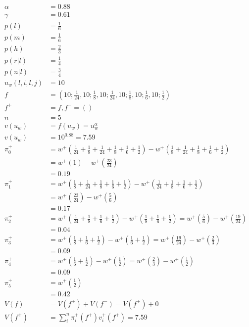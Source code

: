 \documentclass[graybox]{svmult}
\begin{document}
\begin{align*}
\alpha &= 0.88\\
\gamma &= 0.61\\
p(l) &= \frac{1}{6}\\
p(m) &= \frac{1}{6}\\
p(h) &= \frac{2}{3}\\
p(r | l) &= \frac{1}{4}\\
p(n | l) &= \frac{3}{4}\\
u_{w}(l, i, l, j) &= 10\\
f&=(10;\frac{1}{24},10;\frac{1}{8},10;\frac{1}{24},10;\frac{1}{8},10;\frac{1}{6},10;\frac{1}{2})\\
f^{+}&=f,f^{-}=()\\
n &= 5\\
v(u_{w}) &= f(u_{w}) = u_{w}^\alpha\\
v(u_{w}) &= 10^{0.88} = 7.59\\
\pi_{0}^{+}&=w^{+}(\frac{1}{24} + \frac{1}{8} + \frac{1}{24} + \frac{1}{8} + \frac{1}{6} + \frac{1}{2}) - w^{+}(\frac{1}{8} + \frac{1}{24} + \frac{1}{8} + \frac{1}{6} + \frac{1}{2})\\
&=w^{+}(1) - w^{+}(\frac{23}{24})\\
&=0.19\\
\pi_{1}^{+}&=w^{+}(\frac{1}{8} + \frac{1}{24} + \frac{1}{8} + \frac{1}{6} + \frac{1}{2}) - w^{+}(\frac{1}{24} + \frac{1}{8} + \frac{1}{6} + \frac{1}{2})\\
&=w^{+}(\frac{23}{24}) - w^{+}(\frac{5}{6})\\
&= 0.17\\
\pi_{2}^{+}&=w^{+}(\frac{1}{24} + \frac{1}{8} + \frac{1}{6} + \frac{1}{2}) - w^{+}(\frac{1}{8} + \frac{1}{6} + \frac{1}{2})=w^{+}(\frac{5}{6}) - w^{+}(\frac{19}{24})\\
&= 0.04\\
\pi_{3}^{+}&=w^{+}(\frac{1}{8} + \frac{1}{6} + \frac{1}{2}) - w^{+}(\frac{1}{6} + \frac{1}{2})=w^{+}(\frac{19}{24}) - w^{+}(\frac{2}{3})\\
&= 0.09\\
\pi_{4}^{+}&=w^{+}(\frac{1}{6} + \frac{1}{2}) - w^{+}(\frac{1}{2})=w^{+}(\frac{2}{3}) - w^{+}(\frac{1}{2})\\
&= 0.09\\
\pi_{5}^{+}&=w^{+}(\frac{1}{2})\\
&= 0.42\\
V(f) &= V(f^{+}) + V(f^{-}) = V(f^{+}) + 0\\
V(f^{+}) &= \sum_{i}^{n}\pi_{i}^{+}(f^{+})v_{i}^{+}(f^{+}) = 7.59
\end{align*}
\end{document}
